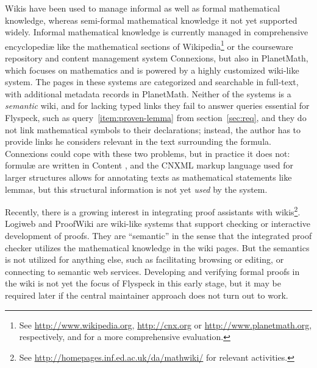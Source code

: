 \label{sec:math-wiki}

Wikis have been used to manage informal as well as formal mathematical knowledge, whereas
semi-formal mathematical knowledge it not yet supported widely.
Informal mathematical knowledge is currently managed in comprehensive encyclopediæ like
the mathematical sections of Wikipedia\footnote{See
  \url{http://www.wikipedia.org}, \url{http://cnx.org} or \url{http://www.planetmath.org},
  respectively, and\cite{Lange:swmkm-tr07} for a more comprehensive evaluation.} or the
courseware repository and content management system
Connexions\footnotemark[\value{footnote}], but also in
PlanetMath\footnotemark[\value{footnote}], which focuses on mathematics and is
powered by a highly customized wiki-like system.  The pages in these systems are
categorized and searchable in full-text, with additional metadata records in
PlanetMath.  Neither of the systems is a \emph{semantic} wiki, and for lacking
typed links they fail to answer queries essential for Flyspeck, such as
query~\ref{item:proven-lemma} from section~\ref{sec:req}, and they do not link
mathematical symbols to their declarations; instead, the author has to provide links he
considers relevant in the text surrounding the formula.  Connexions could cope
with these two problems, but in practice it does not: formulæ are written in Content
{\mathml}\cite{CarlisleEd:MathML07}, and the CNXML markup language used for larger
structures allows for annotating texts as mathematical statements like
lemmas\cite{connexions05:cnxml}, but this structural information is not yet \emph{used}
by the system.

Recently, there is a growing interest in integrating proof assistants
with wikis\footnote{See
  \url{http://homepages.inf.ed.ac.uk/da/mathwiki/} for relevant
  activities.}.  Logiweb and ProofWiki are
wiki-like systems that support checking or interactive development of
proofs. They are ``semantic'' in the sense that the integrated proof
checker utilizes the mathematical knowledge in the wiki pages.  But
the semantics is not utilized for anything else, such as facilitating
browsing or editing, or connecting to semantic web services.
Developing and verifying formal proofs in the wiki is not yet the
focus of Flyspeck in this early stage, but it may be required later if
the central maintainer approach does not turn out to
work.

